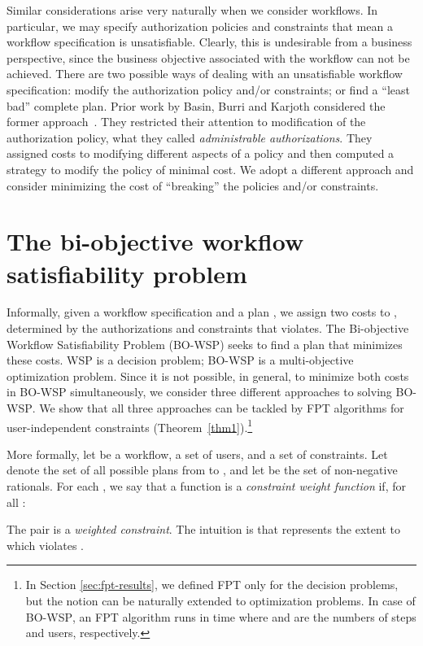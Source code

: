 \documentclass[jcs,crcready]{iosart1c}
\newcommand{\BOWSP}{\textsc{BO-WSP}\xspace}
\begin{document}
Similar considerations arise very naturally when we consider workflows.
In particular, we may specify authorization policies and constraints that mean a workflow specification is unsatisfiable.
Clearly, this is undesirable from a business perspective, since the business objective associated with the workflow can not be achieved.
There are two possible ways of dealing with an unsatisfiable workflow specification: modify the authorization policy and/or constraints; or find a ``least bad'' complete plan.
Prior work by Basin, Burri and Karjoth considered the former approach~\cite{BaBuKa12}.
They restricted their attention to modification of the authorization policy, what they called \emph{administrable authorizations}.
They assigned costs to modifying different aspects of a policy and then computed a strategy to modify the policy of minimal cost.
We adopt a different approach and consider minimizing the cost of ``breaking'' the policies and/or constraints.

\section{The bi-objective workflow satisfiability problem}\label{sec:wwsp}

Informally, given a workflow specification and a plan , we assign two costs to , determined by the authorizations and constraints that  violates. 
The {\sc Bi-objective Workflow Satisfiability Problem} (\BOWSP) seeks to find a plan that minimizes these costs.
WSP is a decision problem; \BOWSP is a multi-objective optimization problem.
Since it is not possible, in general, to minimize both costs in \BOWSP simultaneously, we consider three different approaches to solving \BOWSP.
We show that all three approaches can be tackled by FPT algorithms for user-independent constraints (Theorem~\ref{thm1}).\footnote{In Section \ref{sec:fpt-results}, we defined FPT only for the decision problems, but the notion can be naturally extended to optimization problems. In case of \BOWSP, an FPT algorithm runs in time  where  and  are the numbers of steps and users, respectively.}

More formally, let  be a workflow,  a set of users, and  a
set of constraints. Let  denote the set of all possible plans from  to , and let  be the set of non-negative rationals.
For each , we say that a function  is a \emph{constraint weight function} if, for all :
 
The pair  is a \emph{weighted constraint}.
The intuition is that  represents the extent to which  violates .
\end{document}
